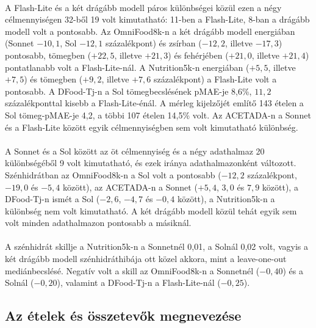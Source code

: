 \paragraph{}A Flash-Lite és a két drágább modell páros különbségei közül ezen a négy 
célmennyiségen 32-ből 19 volt kimutatható: 11-ben a Flash-Lite, 8-ban a drágább modell 
volt a pontosabb. Az OmniFood8k-n a két drágább modell energiában (Sonnet $-10{,}1$, Sol 
$-12{,}1$ százalékpont) és zsírban ($-12{,}2$, illetve $-17{,}3$) pontosabb, tömegben 
($+22{,}5$, illetve $+21{,}3$) és fehérjében ($+21{,}0$, illetve $+21{,}4$) pontatlanabb 
volt a Flash-Lite-nál. A Nutrition5k-n energiában ($+5{,}5$, illetve $+7{,}5$) és 
tömegben ($+9{,}2$, illetve $+7{,}6$ százalékpont) a Flash-Lite volt a pontosabb. A 
DFood-Tj-n a Sol tömegbecslésének pMAE-je 8,6\%, $11{,}2$ százalékponttal kisebb a 
Flash-Lite-énál. A mérleg kijelzőjét említő 143 ételen a Sol tömeg-pMAE-je 4,2, a többi 107 ételen 14,5\% volt. Az ACETADA-n a Sonnet és a Flash-Lite között egyik célmennyiségben sem 
volt kimutatható különbség.

\paragraph{}A Sonnet és a Sol között az öt célmennyiség és a négy adathalmaz 20 
különbségéből 9 volt kimutatható, és ezek iránya adathalmazonként változott. 
Szénhidrátban az OmniFood8k-n a Sol volt a pontosabb ($-12{,}2$ százalékpont, 
$-19{,}0$ és $-5{,}4$ között), az ACETADA-n a Sonnet ($+5{,}4$, $3{,}0$ és $7{,}9$ között), 
a DFood-Tj-n ismét a Sol ($-2{,}6$, $-4{,}7$ és $-0{,}4$ között), a Nutrition5k-n a 
különbség nem volt kimutatható. A két drágább modell közül tehát egyik sem volt minden 
adathalmazon pontosabb a másiknál.

\paragraph{}A szénhidrát skillje a Nutrition5k-n a Sonnetnél 0,01, a Solnál 0,02 volt, 
vagyis a két drágább modell szénhidráthibája ott közel akkora, mint a leave-one-out 
mediánbecslésé. Negatív volt a skill az OmniFood8k-n a Sonnetnél ($-0{,}40$) és a 
Solnál ($-0{,}20$), valamint a DFood-Tj-n a Flash-Lite-nál ($-0{,}25$).
\subsection{Az ételek és összetevők megnevezése}
\label{sec:felismeres}
